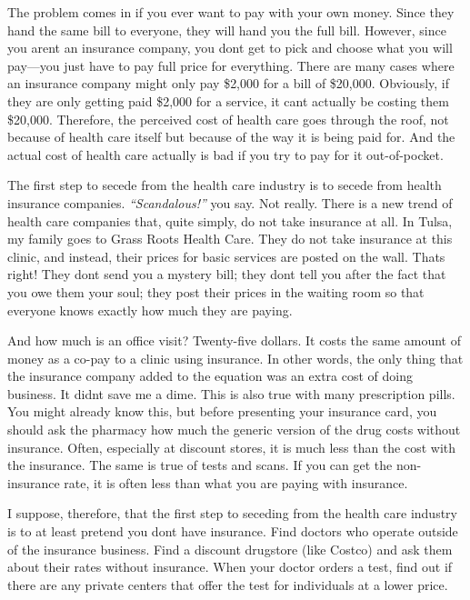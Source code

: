 The problem comes in if you ever want to pay with your own money. Since
they hand the same bill to everyone, they will hand you the full bill.
However, since you aren{\textquotesingle}t an insurance company, you
don{\textquotesingle}t get to pick and choose what you will pay—you
just have to pay full price for everything. There are many cases where
an insurance company might only pay \$2,000 for a bill of \$20,000.
Obviously, if they are only getting paid \$2,000 for a service, it
can{\textquotesingle}t actually be costing them \$20,000. Therefore,
the perceived cost of health care goes through the roof, not because of
health care itself but because of the way it is being paid for. And the
actual cost of health care actually is bad if you try to pay for it
out-of-pocket.


The first step to secede from the health care industry is to secede from
health insurance companies.
\textit{“}\textit{Scandalous!”
}you say. Not really.
There is a new trend of health care companies that, quite simply, do
not take insurance at all. In Tulsa, my family goes to Grass Roots
Health Care.  They do not take insurance at this clinic, and instead,
their prices for basic services are posted on the wall. 
That{\textquotesingle}s
right! They
don{\textquotesingle}t send you a mystery bill; they
don{\textquotesingle}t tell you after the fact that you owe them your
soul; they post their prices in the waiting room so that everyone knows
exactly how much they are paying.


And how much is an office visit?  Twenty-five dollars. It costs the same
amount of money as a co-pay to a clinic using insurance. In other
words, the only thing that the insurance company added to the equation
was an extra cost of doing business. It didn{\textquotesingle}t save me
a dime. This is also true with many prescription pills.
You might already know
this, but before presenting your insurance card, you should ask the
pharmacy how much the generic version of the drug costs without
insurance. Often, especially at discount stores, it is much less than
the cost with the insurance.  The same is true of tests and scans. If
you can get the non-insurance rate, it is often less than what you are
paying with insurance.


I suppose, therefore,
that\textit{ }the
first step to seceding from the health care industry is to at least
pretend you don{\textquotesingle}t have insurance. Find doctors who
operate outside of the insurance business. Find a discount drugstore
(like Costco) and ask them about their rates without insurance. When
your doctor orders a test, find out if there are any private centers
that offer the test for individuals at a lower price. 


